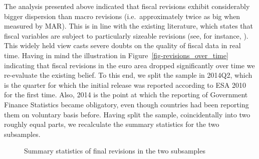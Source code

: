 \documentclass[
  letterpaper,
  authoryear,
  preprint,
  3p]{elsarticle}
\begin{document}
The analysis presented above indicated that fiscal revisions exhibit
considerably bigger dispersion than macro revisions (i.e.~approximately
twice as big when measured by MAR). This is in line with the existing
literature, which states that fiscal variables are subject to
particularly sizeable revisions (see, for instance,
\citet{Cimadomo_2016_jes}). This widely held view casts severe doubts on
the quality of fiscal data in real time. Having in mind the illustration
in Figure~\ref{fig-revisions_over_time} indicating that fiscal revisions
in the euro area dropped significantly over time we re-evaluate the
existing belief. To this end, we split the sample in 2014Q2, which is
the quarter for which the initial release was reported according to ESA
2010 for the first time. Also, 2014 is the point at which the reporting
of Government Finance Statistics became obligatory, even though
countries had been reporting them on voluntary basis before. Having
split the sample, coincidentally into two roughly equal parts, we
recalculate the summary statistics for the two subsamples.

\begin{figure}

\begin{minipage}[t]{\linewidth}

{\centering 


}

\end{minipage}%
\newline
\begin{minipage}[t]{\linewidth}

{\centering 


}

\end{minipage}%

\caption{\label{fig-RevGItems_prepost2014}Summary statistics of final
revisions in the two subsamples}

\end{figure}
\end{document}
